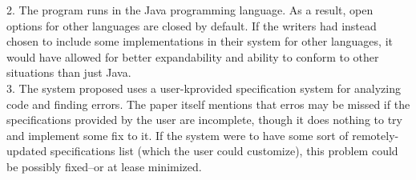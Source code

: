 \documentclass[12pt, a4paper]{article}
\begin{document}
	2.    The program runs in the Java programming language.  As a result, open options for other languages are closed by default.  If the writers had instead chosen to include some implementations in their system for other languages, it would have allowed for better expandability and ability to conform to other situations than just Java. \\

	3.    The system proposed uses a user-kprovided specification system for analyzing code and finding errors.  The paper itself mentions that erros may be missed if the specifications provided by the user are incomplete, though it does nothing to try and implement some fix to it.  If the system were to have some sort of remotely-updated specifications list (which the user could customize), this problem could be possibly fixed--or at lease minimized.     \\
\end{document}
